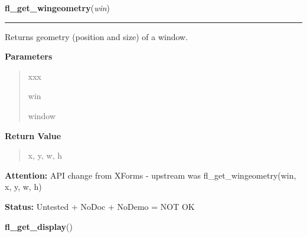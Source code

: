 \hspace{.8\funcindent}\begin{boxedminipage}{\funcwidth}

    \raggedright \textbf{fl\_get\_wingeometry}(\textit{win})

    \vspace{-1.5ex}

    \rule{\textwidth}{0.5\fboxrule}
\setlength{\parskip}{2ex}
    Returns geometry (position and size) of a window.

\setlength{\parskip}{1ex}
      \textbf{Parameters}
      \vspace{-1ex}

      \begin{quote}
        \begin{Ventry}{xxx}

          \item[win]

          window

        \end{Ventry}

      \end{quote}

      \textbf{Return Value}
    \vspace{-1ex}

      \begin{quote}
      x, y, w, h

      \end{quote}

\textbf{Attention:} API change from XForms - upstream was fl\_get\_wingeometry(win, x, y, w, h)



\textbf{Status:} Untested + NoDoc + NoDemo = NOT OK



    \end{boxedminipage}

    \label{xformslib:library:fl_get_display}

    \vspace{0.5ex}

\hspace{.8\funcindent}\begin{boxedminipage}{\funcwidth}

    \raggedright \textbf{fl\_get\_display}()

\setlength{\parskip}{2ex}
\setlength{\parskip}{1ex}
    \end{boxedminipage}

